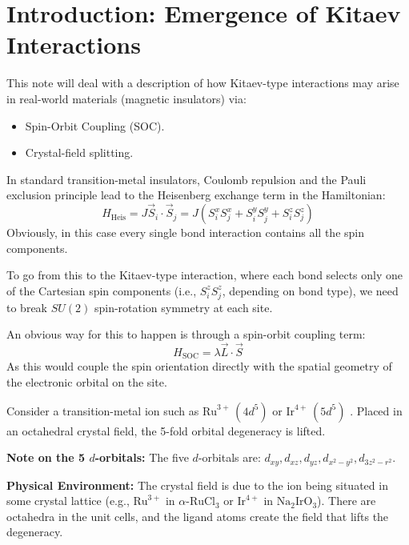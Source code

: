 \documentclass[11pt,a4paper]{article}
\begin{document}
\section{Introduction: Emergence of Kitaev Interactions}

This note will deal with a description of how Kitaev-type interactions may arise in real-world materials (magnetic insulators) via:
\begin{itemize}
    \item Spin-Orbit Coupling (SOC).
    \item Crystal-field splitting.
\end{itemize}

In standard transition-metal insulators, Coulomb repulsion and the Pauli exclusion principle lead to the Heisenberg exchange term in the Hamiltonian:
\begin{equation}
    H_{\text{Heis}} = J \vec{S}_{i} \cdot \vec{S}_{j} = J \left( S_i^x S_j^x + S_i^y S_j^y + S_i^z S_j^z \right)
\end{equation}
Obviously, in this case every single bond interaction contains all the spin components.

To go from this to the Kitaev-type interaction, where each bond selects only one of the Cartesian spin components (i.e., $S_{i}^{z} S_{j}^{z}$, depending on bond type), we need to break $SU(2)$ spin-rotation symmetry at each site.

An obvious way for this to happen is through a spin-orbit coupling term:
\begin{equation}
    H_{\text{SOC}} = \lambda \vec{L} \cdot \vec{S}
\end{equation}
As this would couple the spin orientation directly with the spatial geometry of the electronic orbital on the site.

Consider a transition-metal ion such as $\text{Ru}^{3+}\,(4d^5)$ or $\text{Ir}^{4+}\,(5d^5)$ \label{ref-ion}. Placed in an octahedral crystal field, the 5-fold orbital degeneracy is lifted.

\begin{sidenote}
    \textbf{Note on the 5 $d$-orbitals:}
    The five $d$-orbitals are: $d_{xy}, d_{xz}, d_{yz}, d_{x^2-y^2}, d_{3z^2-r^2}$.
    
    \textbf{Physical Environment:}
    The crystal field is due to the ion being situated in some crystal lattice (e.g., $\text{Ru}^{3+}$ in $\alpha\text{-RuCl}_3$ or $\text{Ir}^{4+}$ in $\text{Na}_2\text{IrO}_3$). There are octahedra in the unit cells, and the ligand atoms create the field that lifts the degeneracy.
\end{sidenote}
\end{document}
